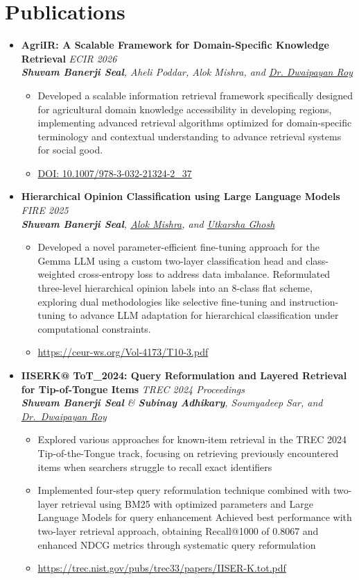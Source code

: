 \documentclass[a4paper,10pt]{article}
\newcommand{\resumeProject}[4]{
    \item\small{
        \textbf{#1} \hfill \textit{#2}\\
        \textit{#3}\\
        \begin{itemize}[leftmargin=1.5em,label=\textbullet,nosep,itemsep=0.5pt]
            #4
        \end{itemize}
    }\vspace{2pt}
}
\newcommand{\compactSection}[2]{
    \section{#1}
    \vspace{-0.1cm}
    #2
    \vspace{-0.2cm}
}
\begin{document}
\compactSection{Publications}{
\begin{itemize}[leftmargin=*,label={},itemsep=4pt]

    \resumeProject{AgriIR: A Scalable Framework for Domain-Specific Knowledge Retrieval}{ECIR 2026}
    {\textbf{Shuvam Banerji Seal}, Aheli Poddar, Alok Mishra, and \href{https://dwaipayanroy.github.io/}{Dr. Dwaipayan Roy}}
    {\item Developed a scalable information retrieval framework specifically designed for agricultural domain knowledge accessibility in developing regions, implementing advanced retrieval algorithms optimized for domain-specific terminology and contextual understanding to advance retrieval systems for social good.
    \item \href{https://doi.org/10.1007/978-3-032-21324-2_37}{\small DOI: 10.1007/978-3-032-21324-2\_37}}

    \resumeProject{Hierarchical Opinion Classification using Large Language Models}{FIRE 2025}
    {\textbf{Shuvam Banerji Seal}, \href{https://alok-mishra6.github.io/}{Alok Mishra}, and \href{https://utkarshaghosh.netlify.app/}{Utkarsha Ghosh}}
    {\item Developed a novel parameter-efficient fine-tuning approach for the Gemma LLM using a custom two-layer classification head and class-weighted cross-entropy loss to address data imbalance. Reformulated three-level hierarchical opinion labels into an 8-class flat scheme, exploring dual methodologies like selective fine-tuning and instruction-tuning to advance LLM adaptation for hierarchical classification under computational constraints.
    \item \href{https://ceur-ws.org/Vol-4173/T10-3.pdf}{\small \url{https://ceur-ws.org/Vol-4173/T10-3.pdf}}}

    \resumeProject{IISERK@ ToT\_2024: Query Reformulation and Layered Retrieval for Tip-of-Tongue Items}{TREC 2024 Proceedings}
    {\textbf{Shuvam Banerji Seal} \& \textbf{Subinay Adhikary}, Soumyadeep Sar, and \href{https://dwaipayanroy.github.io/}{Dr.\ Dwaipayan Roy}}
    {\item Explored various approaches for known-item retrieval in the TREC 2024 Tip-of-the-Tongue track, focusing on retrieving previously encountered items when searchers struggle to recall exact identifiers
    \item Implemented four-step query reformulation technique combined with two-layer retrieval using BM25 with optimized parameters and Large Language Models for query enhancement
    Achieved best performance with two-layer retrieval approach, obtaining Recall@1000 of 0.8067 and enhanced NDCG metrics through systematic query reformulation
    \item \href{https://trec.nist.gov/pubs/trec33/papers/IISER-K.tot.pdf}{\small \url{https://trec.nist.gov/pubs/trec33/papers/IISER-K.tot.pdf}}}




\end{itemize}}
\end{document}
